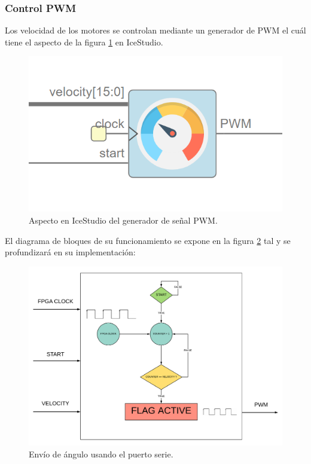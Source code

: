 \subsubsection{Control PWM}

Los velocidad de los motores se controlan mediante un generador de PWM el cuál tiene el aspecto de la figura \ref{fig:pwm_module} en IceStudio. 

	\begin{figure}[H]
	\center
	\includegraphics[scale=0.5]{imagenes/Balancing_robot/PWM_module.PNG}
	\caption{Aspecto en IceStudio del generador de señal PWM.}
	\label{fig:pwm_module}
\end{figure}

El diagrama de bloques de su funcionamiento se expone en la figura \ref{fig:pwm_control} tal y se profundizará en su implementación:

\begin{figure}[H]
	\center
	\includegraphics[trim = 0mm 0mm 0mm 0mm, clip,scale=0.6]{imagenes/Balancing_robot/pwm_control.pdf}
	\caption{Envío de ángulo usando el puerto serie.}
	\label{fig:pwm_control}
\end{figure}


